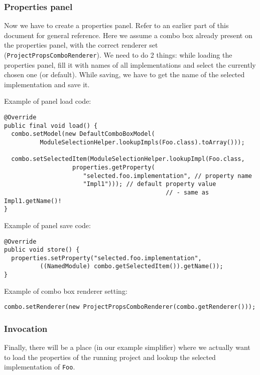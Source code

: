 \documentclass[a4paper,10pt,oneside]{article}
\begin{document}
\subsubsection*{Properties panel}

\par 
  Now we have to create a properties panel. Refer to an
  earlier part of this document for general
  reference. Here we assume a combo box already present on the properties panel,
  with the correct renderer set (\texttt{ProjectPropsComboRenderer}).
  We need to do 2 things: while loading the properties panel, fill it with
  names of all implementations and select the currently chosen one (or default).
  While saving, we have to get the name of
  the selected implementation and save it.


\noindent Example of panel load code:
\begin{verbatim}
@Override
public final void load() {
  combo.setModel(new DefaultComboBoxModel(
          ModuleSelectionHelper.lookupImpls(Foo.class).toArray()));

  combo.setSelectedItem(ModuleSelectionHelper.lookupImpl(Foo.class,
                   properties.getProperty(
                      "selected.foo.implementation", // property name
                      "Impl1"))); // default property value
                                             // - same as Impl1.getName()!
}
\end{verbatim}

\noindent Example of panel save code:
\begin{verbatim}
@Override
public void store() {
  properties.setProperty("selected.foo.implementation",
          ((NamedModule) combo.getSelectedItem()).getName());
}
\end{verbatim}

\noindent Example of combo box renderer setting:
\begin{verbatim}
combo.setRenderer(new ProjectPropsComboRenderer(combo.getRenderer()));
\end{verbatim}

\subsubsection*{Invocation}

\par 
  Finally, there will be a place (in our example simplifier) where we actually
  want to load the properties of the running project and lookup the selected
  implementation of \texttt{Foo}.
\end{document}
